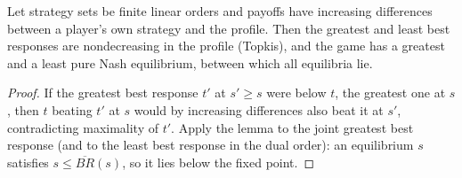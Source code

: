\begin{theorem}
\label{thm:supermodular}
\leanok
{}
Let strategy sets be finite linear orders and payoffs have increasing differences between a player's own strategy
and the profile. Then the greatest and least best responses are nondecreasing in the profile (Topkis), and the
game has a greatest and a least pure Nash equilibrium, between which all equilibria lie.
\end{theorem}
\begin{proof}
\leanok
If the greatest best response $t'$ at $s' \ge s$ were below $t$, the greatest one at $s$, then $t$ beating $t'$ at
$s$ would by increasing differences also beat it at $s'$, contradicting maximality of $t'$. Apply the lemma to the
joint greatest best response (and to the least best response in the dual order): an equilibrium $s$ satisfies
$s \le \overline{BR}(s)$, so it lies below the fixed point.
\end{proof}
